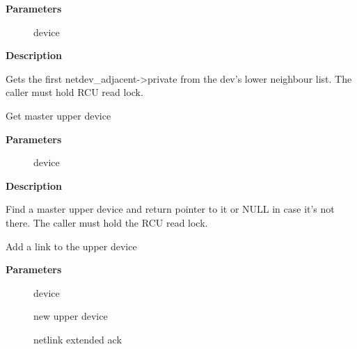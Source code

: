 \documentclass[a4paper,8pt,english]{sphinxmanual}
\begin{document}
\textbf{Parameters}
\begin{description}
\item[{}] \leavevmode
device

\end{description}

\textbf{Description}

Gets the first netdev\_adjacent-\textgreater{}private from the dev's lower neighbour
list. The caller must hold RCU read lock.

\begin{fulllineitems}
\label{networking/kapi:c.netdev_master_upper_dev_get_rcu}
Get master upper device

\end{fulllineitems}


\textbf{Parameters}
\begin{description}
\item[{}] \leavevmode
device

\end{description}

\textbf{Description}

Find a master upper device and return pointer to it or NULL in case
it's not there. The caller must hold the RCU read lock.

\begin{fulllineitems}
\label{networking/kapi:c.netdev_upper_dev_link}
Add a link to the upper device

\end{fulllineitems}


\textbf{Parameters}
\begin{description}
\item[{}] \leavevmode
device

\item[{}] \leavevmode
new upper device

\item[{}] \leavevmode
netlink extended ack

\end{description}
\end{document}
